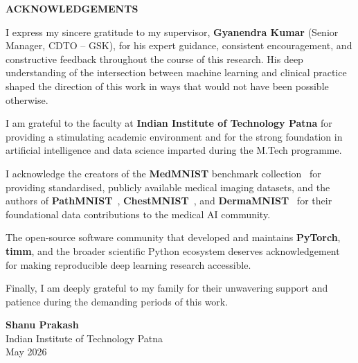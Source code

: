 \documentclass[12pt,a4paper]{report}
\begin{document}

\newpage
\begin{center}
{\large\bfseries ACKNOWLEDGEMENTS}
\end{center}

\vspace{0.8cm}

I express my sincere gratitude to my supervisor, \textbf{Gyanendra
Kumar} (Senior Manager, CDTO -- GSK), for his expert guidance,
consistent encouragement, and constructive feedback throughout the
course of this research. His deep understanding of the intersection
between machine learning and clinical practice shaped the direction of
this work in ways that would not have been possible otherwise.

I am grateful to the faculty at \textbf{Indian Institute of Technology Patna} for
providing a stimulating academic environment and for the strong
foundation in artificial intelligence and data science imparted during
the M.Tech programme.

I acknowledge the creators of the \textbf{MedMNIST} benchmark
collection~\cite{yang2021medmnist} for providing standardised,
publicly available medical imaging datasets, and the authors of
\textbf{PathMNIST}~\cite{kather2019predicting},
\textbf{ChestMNIST}~\cite{wang2017chestx}, and
\textbf{DermaMNIST}~\cite{tschandl2018ham10000} for their
foundational data contributions to the medical AI community.

The open-source software community that developed and maintains
\textbf{PyTorch}, \textbf{timm}, and the broader scientific Python
ecosystem deserves acknowledgement for making reproducible deep learning
research accessible.

Finally, I am deeply grateful to my family for their unwavering support
and patience during the demanding periods of this work.

\vspace{1.5cm}

\begin{flushright}
\textbf{Shanu Prakash}\\
Indian Institute of Technology Patna\\
May 2026
\end{flushright}
\end{document}
